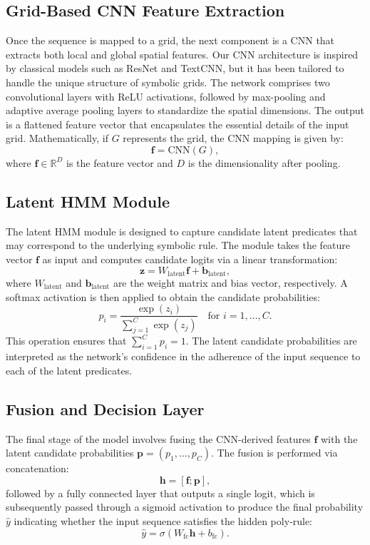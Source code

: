 \documentclass[11pt]{article}
\begin{document}
\subsection{Grid-Based CNN Feature Extraction}
Once the sequence is mapped to a grid, the next component is a CNN that extracts both local and global spatial features. Our CNN architecture is inspired by classical models such as ResNet and TextCNN, but it has been tailored to handle the unique structure of symbolic grids. The network comprises two convolutional layers with ReLU activations, followed by max-pooling and adaptive average pooling layers to standardize the spatial dimensions. The output is a flattened feature vector that encapsulates the essential details of the input grid. Mathematically, if \(G\) represents the grid, the CNN mapping is given by:
\[
\mathbf{f} = \text{CNN}(G),
\]
where \(\mathbf{f} \in \mathbb{R}^{D}\) is the feature vector and \(D\) is the dimensionality after pooling.

\subsection{Latent HMM Module}
The latent HMM module is designed to capture candidate latent predicates that may correspond to the underlying symbolic rule. The module takes the feature vector \(\mathbf{f}\) as input and computes candidate logits via a linear transformation:
\[
\mathbf{z} = W_{\text{latent}} \mathbf{f} + \mathbf{b}_{\text{latent}},
\]
where \(W_{\text{latent}}\) and \(\mathbf{b}_{\text{latent}}\) are the weight matrix and bias vector, respectively. A softmax activation is then applied to obtain the candidate probabilities:
\[
p_i = \frac{\exp(z_i)}{\sum_{j=1}^{C} \exp(z_j)} \quad \text{for } i = 1, \dots, C.
\]
This operation ensures that \(\sum_{i=1}^{C} p_i = 1\). The latent candidate probabilities are interpreted as the network's confidence in the adherence of the input sequence to each of the latent predicates.

\subsection{Fusion and Decision Layer}
The final stage of the model involves fusing the CNN-derived features \(\mathbf{f}\) with the latent candidate probabilities \(\mathbf{p} = (p_1, \dots, p_C)\). The fusion is performed via concatenation:
\[
\mathbf{h} = [\mathbf{f}; \mathbf{p}],
\]
followed by a fully connected layer that outputs a single logit, which is subsequently passed through a sigmoid activation to produce the final probability \(\hat{y}\) indicating whether the input sequence satisfies the hidden poly‐rule:
\[
\hat{y} = \sigma(W_{\text{fc}} \mathbf{h} + b_{\text{fc}}).
\]
\end{document}
